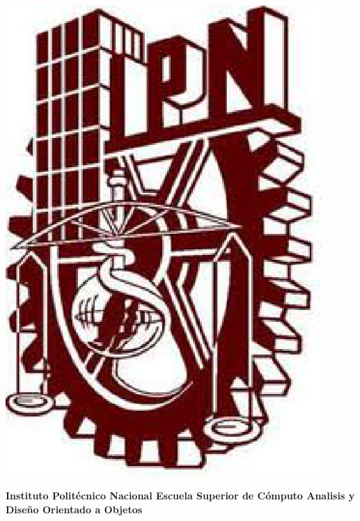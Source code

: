 \thispagestyle{empty}

\begin{minipage}{0.15\textwidth}
	\includegraphics[width=0.9\textwidth]{portada/ipn.eps}
\end{minipage}%
\begin{minipage}{0.65\textwidth}
\begin{center}
\large \bf Instituto Politécnico Nacional \newline
\large \bf Escuela Superior de Cómputo \newline
Analisis y Diseño Orientado a Objetos
\end{center}
\end{minipage}
